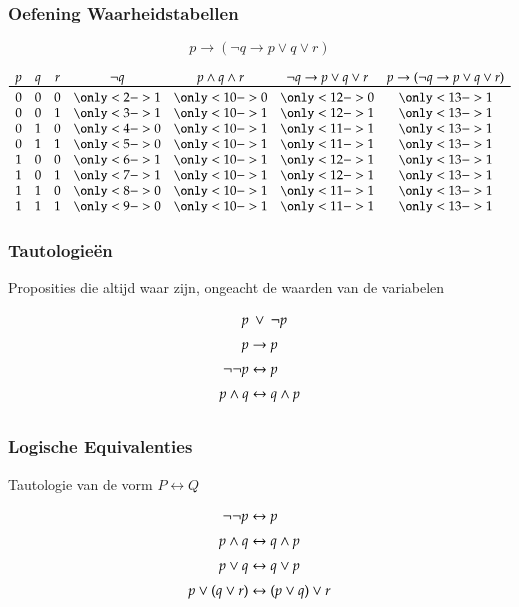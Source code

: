\documentclass[dutch]{../khlslides}
\newcommand{\AND}{\wedge}
\newcommand{\OR}{\vee}
\newcommand{\IMPLIES}{\rightarrow}
\newcommand{\IFF}{\leftrightarrow}
\newcommand{\NOT}{\neg}
\begin{document}
\begin{frame}
  \frametitle{Oefening Waarheidstabellen}
  \large
  \[
    p \IMPLIES (\NOT q \IMPLIES p \OR q \OR r)
  \]
  
  \[
    \begin{array}{cccc@{\quad}c@{\quad}c@{\quad}c}
      p & q & r & \NOT q & p \AND q \AND r & \NOT q \IMPLIES p \OR q \OR r & p \IMPLIES (\NOT q \IMPLIES p \OR q \OR r) \\
      \toprule
      0 & 0 & 0 & \only<2->{1} & \only<10->{0} & \only<12->{0} & \only<13->{1} \\
      0 & 0 & 1 & \only<3->{1} & \only<10->{1} & \only<12->{1} & \only<13->{1} \\
      0 & 1 & 0 & \only<4->{0} & \only<10->{1} & \only<11->{1} & \only<13->{1} \\
      0 & 1 & 1 & \only<5->{0} & \only<10->{1} & \only<11->{1} & \only<13->{1} \\
      1 & 0 & 0 & \only<6->{1} & \only<10->{1} & \only<12->{1} & \only<13->{1} \\
      1 & 0 & 1 & \only<7->{1} & \only<10->{1} & \only<12->{1} & \only<13->{1} \\
      1 & 1 & 0 & \only<8->{0} & \only<10->{1} & \only<11->{1} & \only<13->{1} \\
      1 & 1 & 1 & \only<9->{0} & \only<10->{1} & \only<11->{1} & \only<13->{1} \\
    \end{array}
  \]
\end{frame}

\begin{frame}
  \frametitle{Tautologie\"en}
  \begin{center}
    Proposities die altijd waar zijn, ongeacht de waarden van de variabelen
  \end{center}
  \vskip4mm
  \[
  \begin{array}{r@{\;}c@{\;}l}
      p & \OR & \NOT p \\[2mm]
      p & \IMPLIES & p \\[2mm]
      \NOT\NOT p & \IFF & p \\[2mm]
      p \AND q & \IFF & q \AND p \\[2mm]
    \end{array}
  \]
\end{frame}

\begin{frame}
  \frametitle{Logische Equivalenties}
  \begin{center}
    Tautologie van de vorm $P \IFF Q$
  \end{center}
  \vskip4mm
  \[
  \begin{array}{r@{\;}c@{\;}l}
      \NOT\NOT p & \IFF & p \\[2mm]
      p \AND q & \IFF & q \AND p \\[2mm]
      p \OR q & \IFF & q \OR p \\[2mm]
      p \OR (q \OR r) & \IFF & (p \OR q) \OR r \\[2mm]
    \end{array}
  \]
\end{frame}
\end{document}
